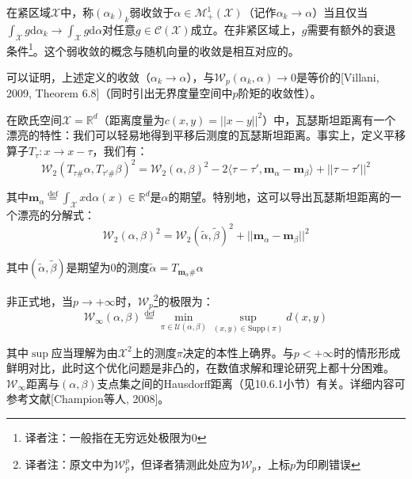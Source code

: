 \documentclass[cn,10pt,math=newtx,citestyle=gb7714-2015,bibstyle=gb7714-2015]{elegantbook}
\begin{document}
\begin{definition}[弱收敛性]
在紧区域$\mathcal{X}$中，称$(\alpha_k)_k$弱收敛于$\alpha\in\mathcal{M}_+^1(\mathcal{X})$（记作$\alpha_k\to \alpha$）当且仅当$\int_\mathcal{X}g\text{d}\alpha_k\to\int_\mathcal{X}g\text{d}\alpha$对任意$g\in\mathcal{C(X)}$成立。在非紧区域上，$g$需要有额外的衰退条件\footnote{译者注：一般指在无穷远处极限为$0$}。这个弱收敛的概念与随机向量的收敛是相互对应的。
\end{definition}

可以证明，上述定义的收敛（$\alpha_k\to \alpha$），与$\mathcal{W}_p(\alpha_k,\alpha)\to 0$是等价的[Villani, 2009, Theorem 6.8]（同时引出无界度量空间中$p$阶矩的收敛性）。

\begin{postulate}[平移]

在欧氏空间$\mathcal{X}=\mathbb{R}^d$（距离度量为$c(x,y)=||x-y||^2$）中，瓦瑟斯坦距离有一个漂亮的特性：我们可以轻易地得到平移后测度的瓦瑟斯坦距离。事实上，定义平移算子$T_\tau:x\to x-\tau$，我们有：
\begin{equation*}
    \mathcal{W}_2(T_{\tau\#}\alpha,T_{\tau'\#}\beta)^2=\mathcal{W}_2(\alpha,\beta)^2-2\langle \tau-\tau', \mathbf{m}_\alpha-\mathbf{m}_\beta \rangle + ||\tau-\tau'||^2
\end{equation*}

其中$\mathbf{m}_\alpha\overset{\text{def}}{=}\int_\mathcal{X}x\text{d}\alpha(x)\in\mathbb{R}^d$是$\alpha$的期望。特别地，这可以导出瓦瑟斯坦距离的一个漂亮的分解式：
\begin{equation*}
    \mathcal{W}_2(\alpha,\beta)^2=\mathcal{W}_2(\tilde\alpha,\tilde\beta)^2+||\mathbf{m}_\alpha-\mathbf{m}_\beta||^2
\end{equation*}

其中$(\tilde\alpha,\tilde\beta)$是期望为$0$的测度$\tilde\alpha=T_{\mathbf{m}_\alpha\#}\alpha$

\end{postulate}

\begin{postulate}[$p=+\infty$的情形]

非正式地，当$p\to+\infty$时，$\mathcal{W}_p$\footnote{译者注：原文中为$\mathcal{W}_p^p$，但译者猜测此处应为$\mathcal{W}_p$，上标$p$为印刷错误}的极限为：
\begin{equation}
    \label{2.19}
    \mathcal{W}_\infty(\alpha,\beta)\overset{\text{def}}{=}\min\limits_{\pi\in\mathcal{U}(\alpha,\beta)}\sup\limits_{(x,y)\in\text{Supp}(\pi)}d(x,y)
\end{equation}

其中$\sup$应当理解为由$\mathcal{X}^2$上的测度$\pi$决定的本性上确界。与$p<+\infty$时的情形形成鲜明对比，此时这个优化问题是非凸的，在数值求解和理论研究上都十分困难。$\mathcal{W}_\infty$距离与$(\alpha,\beta)$支点集之间的Hausdorff距离（见10.6.1小节）有关。详细内容可参考文献[Champion等人, 2008]。

\end{postulate}
\end{document}
